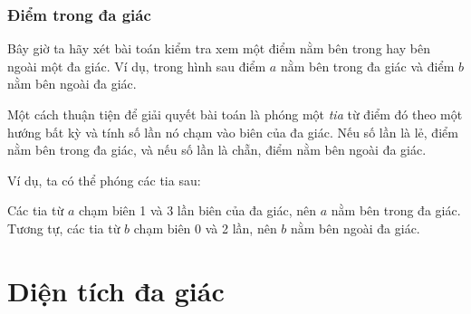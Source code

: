 \subsubsection{Điểm trong đa giác}

Bây giờ ta hãy xét bài toán
kiểm tra xem một điểm nằm bên trong hay bên ngoài
một đa giác.
Ví dụ, trong hình sau điểm $a$
nằm bên trong đa giác và điểm $b$ nằm bên ngoài
đa giác.

\begin{center}
\end{center}

Một cách thuận tiện để giải quyết bài toán là
phóng một \emph{tia} từ điểm đó theo một hướng bất kỳ
và tính số lần nó chạm
vào biên của đa giác.
Nếu số lần là lẻ,
điểm nằm bên trong đa giác,
và nếu số lần là chẵn,
điểm nằm bên ngoài đa giác.

\begin{samepage}
Ví dụ, ta có thể phóng các tia sau:
\begin{center}
\end{center}
\end{samepage}

Các tia từ $a$ chạm biên 1 và 3 lần
biên của đa giác,
nên $a$ nằm bên trong đa giác.
Tương tự, các tia từ $b$
chạm biên 0 và 2 lần,
nên $b$ nằm bên ngoài đa giác.

\section{Diện tích đa giác}

